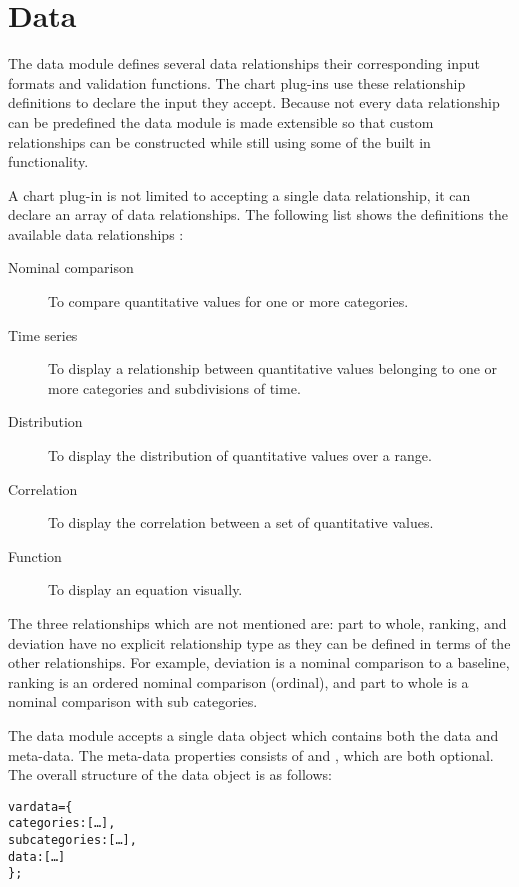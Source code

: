 \section{Data}
The data module defines several data relationships their corresponding input formats and validation functions. The chart plug-ins use these relationship definitions to declare the input they accept. Because not every data relationship can be predefined the data module is made extensible so that custom relationships can be constructed while still using some of the built in functionality.

A chart plug-in is not limited to accepting a single data relationship, it can declare an array of data relationships. The following list shows the definitions the available data relationships \cite{few06}:

\begin{description}
\item[Nominal comparison] To compare quantitative values for one or more categories.
\item[Time series] To display a relationship between quantitative values belonging to one or more categories and subdivisions of time.
\item[Distribution] To display the distribution of quantitative values over a range.
\item[Correlation] To display the correlation between a set of quantitative values.
\item[Function] To display an equation visually.
\end{description}

The three relationships which are not mentioned are: part to whole, ranking, and deviation have no explicit relationship type as they can be defined in terms of the other relationships. For example, deviation is a nominal comparison to a baseline, ranking is an ordered nominal comparison (ordinal), and part to whole is a nominal comparison with sub categories.

The data module accepts a single data object which contains both the data and meta-data. The meta-data properties consists of  and , which are both optional. The overall structure of the data object is as follows:
\begin{alltt}
  var data = \{
    categories: [\ldots],
    subcategories: [\ldots],
    data: [\ldots]
  \};
\end{alltt}

